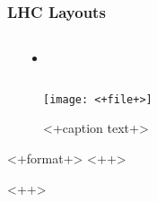\begin{frame}\frametitle{LHC Layouts}\fontsize{9pt}{7.5}\selectfont
        \begin{columns}[T]
                \begin{block}{}
                        \begin{center}

                        \end{center}
                \end{block}

                \begin{block}{}
                \begin{itemize}
                  \item
                \end{itemize}
                \end{block}
        \end{columns}
\end{frame}


\begin{figure}[<+htpb+>]
  \centering
  \texttt{[image: <+file+>]}
  \caption{<+caption text+>}
  \label{fig:<+label+>}
\end{figure}

\begin{tabular}[<+position+>]{<+format+>}
  <++>
\end{tabular}<++>


